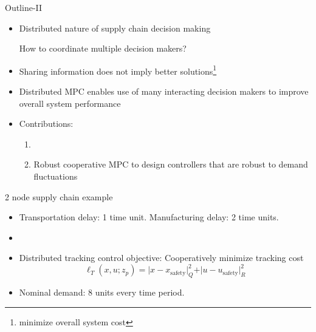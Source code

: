 \documentclass[table]{beamer}
\newcommand{\norm}[1]{\vert #1 \vert}
\begin{document}
{\NoHeaderFooter
\begin{frame}{Outline-II}
\begin{itemize}
\item Distributed nature of supply chain decision making \\
 \centerline{\alert{ How to coordinate multiple decision makers?}}
\item Sharing information does not imply better
  solutions\footnote{minimize overall system cost}  

\item \alert{Distributed} MPC enables use of many interacting decision
  makers to improve overall system performance\footnotemark[\value{footnote}] 

\item Contributions:
 \begin{enumerate}
   \item {\color{blue}{Stability \& convergence guarantees extended to cover supply
     chain models}} 
   \item {\color{gray} {Robust cooperative MPC to design controllers
       that are robust to demand fluctuations}}
 \end{enumerate}
\end{itemize}
\end{frame}
}

\begin{frame}{2 node supply chain example}
  \begin{figure}
   \centering
   \resizebox{0.75\textwidth}{!}{\Large }
  \end{figure}
 \begin{itemize}
  \item Transportation delay: 1 time unit. Manufacturing delay: 2 time units.
  \item {}
   \item {\alert{Distributed tracking control objective}: Cooperatively minimize tracking cost
      \[ \ell_T(x,u;z_p) = \norm{x-x_{\text{safety}}}_Q^2 + \norm{u-u_{\text{safety}}}_R^2\]}
  \item \alert{Nominal demand}: 8 units every time period. 
 \end{itemize}
\end{frame}
\end{document}
